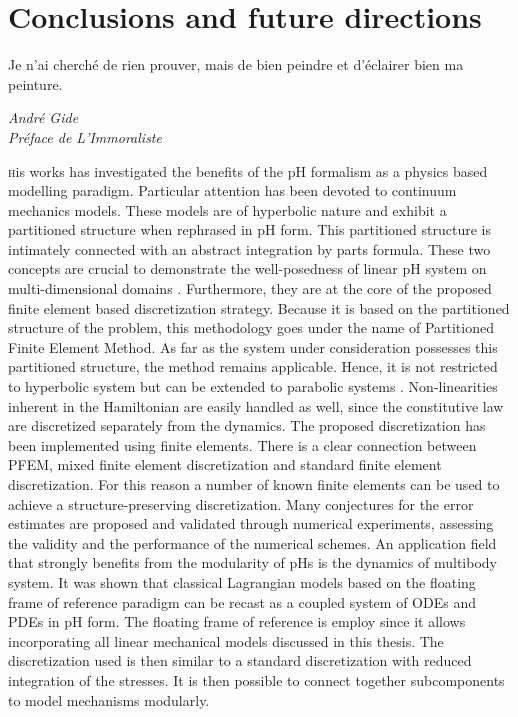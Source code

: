 \chapter*{Conclusions and future directions}

\epigraph{Je n’ai cherché de rien prouver, mais de bien peindre et d’éclairer bien ma peinture.}{\textit{André Gide \\ Préface de L'Immoraliste}}

\lettrine{\color{theme}{T}}his works has investigated the benefits of the pH formalism as a physics based modelling paradigm. Particular attention has been devoted to continuum mechanics models. These models are of hyperbolic nature and exhibit a partitioned structure when rephrased in  pH form. This partitioned structure is intimately connected with an abstract integration by parts formula. These two concepts are crucial to demonstrate the well-posedness of linear pH system on multi-dimensional domains \cite{skrepek2019wellposedness}. Furthermore, they are at the core of the proposed finite element based discretization strategy. Because it is based on the partitioned structure of the problem, this methodology goes under the name of Partitioned Finite Element Method. As far as the system under consideration possesses this partitioned structure, the method remains applicable. Hence, it is not restricted to  hyperbolic system but can be extended to parabolic systems \cite{serhani2019discretization}. Non-linearities inherent in the Hamiltonian are easily handled as well, since the constitutive law are discretized separately from the dynamics. The proposed discretization has been implemented using finite elements. There is a clear connection between PFEM, mixed finite element discretization and standard finite element discretization. For this reason a number of known finite elements can be used to achieve a structure-preserving discretization. Many conjectures for the error estimates are proposed and validated through numerical experiments, assessing the validity and the performance of the numerical schemes. An application field that strongly benefits from the modularity of pHs is the dynamics of multibody system. It was shown that classical Lagrangian models based on the floating frame of reference paradigm can be recast as a coupled system of ODEs and PDEs in pH form. The floating frame of reference is employ since it allows incorporating all linear mechanical models discussed in this thesis. The discretization used is then similar to a standard discretization with reduced integration of the stresses. It is then possible to connect together subcomponents to model mechanisms modularly. \\

